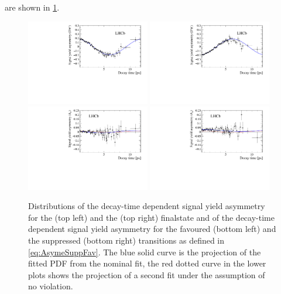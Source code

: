 are shown in \cref{fig:AsymProjection}.
\begin{figure}[tbp]
    \centering
    \includegraphics[width=0.48\textwidth]{10TimeFit/figs/Asym_f.pdf}
    \includegraphics[width=0.48\textwidth]{10TimeFit/figs/Asym_fbar.pdf}\\
    \includegraphics[width=0.48\textwidth]{10TimeFit/figs/Asym_favour.pdf}
    \includegraphics[width=0.48\textwidth]{10TimeFit/figs/Asym_suppress.pdf}
    \caption{Distributions of the decay-time dependent signal yield asymmetry for the \Dm\pip (top left) and the \Dp\pim (top right) finalstate and of the decay-time dependent signal yield asymmetry for the favoured (bottom left) and the suppressed (bottom right) transitions as defined in \cref{eq:AsymeSuppFav}.
    The blue solid curve is the projection of the fitted PDF from the nominal fit, the red dotted curve in the lower plots shows the projection of a second fit under the assumption of no \CP violation.}
    \label{fig:AsymProjection}
\end{figure}

